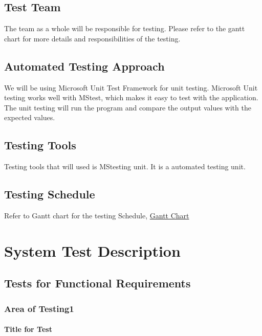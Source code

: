 \documentclass[12pt, titlepage]{article}
\begin{document}
\subsection{Test Team}
The team as a whole will be responsible for testing. Please refer to the gantt chart for more details and responsibilities of the testing.

\subsection{Automated Testing Approach}
We will be using Microsoft Unit Test Framework for unit testing. Microsoft Unit testing works well with MStest, which makes it easy to test with the application. The unit testing will run the program and compare the output values with the expected values.
\subsection{Testing Tools}
Testing tools that will used is MStesting unit. It is a automated testing unit.
\subsection{Testing Schedule}
Refer to Gantt chart for the testing Schedule, \href{run:../../ProjectSchedule/Gantt Chart.gan}{Gantt Chart} 

\section{System Test Description}
	
\subsection{Tests for Functional Requirements} \label{section:31}

\subsubsection{Area of Testing1}
		
\paragraph{Title for Test}
\end{document}
